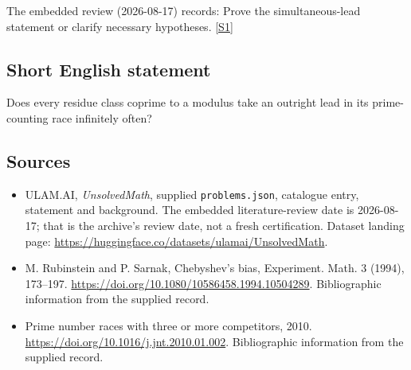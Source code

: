 \documentclass[11pt,a4paper]{article}
\newcommand{\sref}[2]{\hyperlink{source:#1:#2}{[S#2]}}
\begin{document}
The embedded review (2026-08-17) records: Prove the simultaneous-lead statement or clarify necessary hypotheses. \sref{statement}{1}

\subsection{Short English statement}

Does every residue class coprime to a modulus take an outright lead in its prime-counting race infinitely often?

\subsection{Sources}

{\small

\begin{itemize}

\item[\hypertarget{source:statement:1}{S1}] ULAM.AI, \emph{UnsolvedMath}, supplied \texttt{problems.json}, catalogue entry, statement and background. The embedded literature-review date is 2026-08-17; that is the archive’s review date, not a fresh certification. Dataset landing page: \url{https://huggingface.co/datasets/ulamai/UnsolvedMath}.

\item[\hypertarget{source:statement:2}{S2}] M. Rubinstein and P. Sarnak, Chebyshev's bias, Experiment. Math. 3 (1994), 173--197. \url{https://doi.org/10.1080/10586458.1994.10504289}. Bibliographic information from the supplied record.

\item[\hypertarget{source:statement:3}{S3}] Prime number races with three or more competitors, 2010. \url{https://doi.org/10.1016/j.jnt.2010.01.002}. Bibliographic information from the supplied record.

\end{itemize}

}

\label{end:statement}
\end{document}
